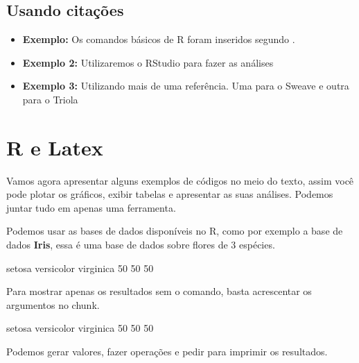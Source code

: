 \documentclass[12pt,a4paper]{article}
\begin{document}
\subsection{Usando citações}

\begin{itemize}
\item \textbf{Exemplo: } Os comandos básicos de R foram inseridos segundo \cite{ref1}. 
\item \textbf{Exemplo 2:} Utilizaremos o RStudio para fazer as análises \cite{rstudio}
\item \textbf{Exemplo 3:} Utilizando mais de uma referência. Uma para o Sweave e outra para o Triola \cite{sweave, triola}
\end{itemize}

\newpage %

\section{R e Latex}

Vamos agora apresentar alguns exemplos de códigos no meio do texto, assim você pode plotar os gráficos, exibir tabelas e apresentar as suas análises. Podemos juntar tudo em apenas uma ferramenta. 

Podemos usar as bases de dados disponíveis no R, como por exemplo a base de dados \textbf{Iris}, essa é uma base de dados sobre flores de 3 espécies.

\begin{Schunk}
\begin{Soutput}
    setosa versicolor  virginica 
        50         50         50 
\end{Soutput}
\end{Schunk}

Para mostrar apenas os resultados sem o comando, basta acrescentar os argumentos no chunk.

\begin{Schunk}
\begin{Soutput}
    setosa versicolor  virginica 
        50         50         50 
\end{Soutput}
\end{Schunk}

Podemos gerar valores, fazer operações e pedir para imprimir os resultados. 
\end{document}
